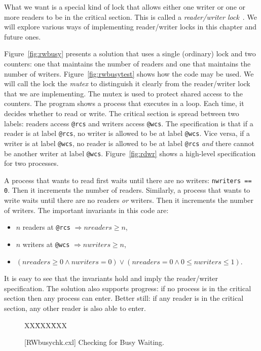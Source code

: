 \documentclass{report}
\newcommand{\cxlsource}[1]{
\begin{tabbing}
XX\=XXX\=XXX\kill
    
\end{tabbing}
}
\newenvironment{code}{
\tcolorbox
}{
\endtcolorbox
}
\begin{document}
What we want is a special kind of lock that allows either one writer
or one or more readers to be in the critical section.  This is called
a \emph{reader/writer lock}~\cite{CHP71}.
We will explore various ways of implementing reader/writer locks in
this chapter and future ones.

Figure~\ref{fig:rwbusy} presents a solution that uses a
single (ordinary) lock and two counters: one that maintains the number
of readers and one that maintains the number of writers.
Figure~\ref{fig:rwbusytest} shows how the code may be used.
We will call the lock the \emph{mutex} to distinguish it clearly from
the reader/writer lock that we are implementing.
The mutex is used to protect shared access to the counters.
The program shows a process that executes in a loop.
Each time, it decides whether to read or write.
The critical section is spread between two labels:
readers access \texttt{@rcs} and writers access \texttt{@wcs}.
The specification is that if a reader is at label \texttt{@rcs},
no writer is allowed to be at label \texttt{@wcs}.  Vice versa, if
a writer is at label \texttt{@wcs}, no reader is allowed to be at
label \texttt{@rcs} \emph{and} there cannot be another writer at
label \texttt{@wcs}.  Figure~\ref{fig:rdwr} shows a high-level
specification for two processes.

A process that wants to read first waits until there are no writers:
\texttt{nwriters == 0}.  Then it increments the number of readers.
Similarly, a
process that wants to write waits until there are no readers \emph{or} writers.
Then it increments the number of writers.
The important invariants in this code are:
\begin{itemize}
\item $n$ readers at \texttt{@rcs} $\Rightarrow \mathit{nreaders} \ge n$,
\item $n$ writers at \texttt{@wcs} $\Rightarrow \mathit{nwriters} \ge n$,
\item $(\mathit{nreaders} \ge 0 \land \mathit{nwriters} = 0) \lor
    (\mathit{nreaders} = 0 \land 0 \le \mathit{nwriters} \le 1)$.
\end{itemize}
It is easy to see that the invariants hold and imply the reader/writer
specification.
The solution also supports progress: if no process is in the critical
section then any process can enter.  Better still: if any reader is in the
critical section, any other reader is also able to enter.

\begin{figure}
\begin{code}
\cxlsource{RWbusychk}
\end{code}
\caption{[RWbusychk.cxl] Checking for Busy Waiting.}
\label{fig:rwblock}
\end{figure}
\end{document}
